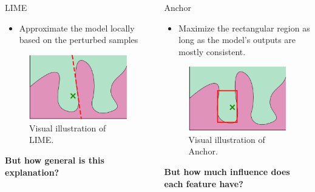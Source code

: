 \documentclass[aspectratio=169]{slide-en}
\begin{document}
\begin{frame}{}
  \vspace{1.5em}
  \begin{columns}[t]
    \begin{column}{0.45\textwidth}
      LIME%
      \begin{itemize}
        \item Approximate the model locally based on the perturbed samples
      \end{itemize}
      \begin{figure}
        \includegraphics[scale=.25]{visual-lime}
        \caption{Visual illustration of LIME\@.}
      \end{figure}
      \textbf{But how general is this explanation?}
    \end{column}
    \begin{column}{0.55\textwidth}
      Anchor
      \begin{itemize}
        \item Maximize the rectangular region as long as
              the model's outputs are mostly consistent.
      \end{itemize}
      \begin{figure}
        \includegraphics[scale=.25]{visual-anchor}
        \caption{Visual illustration of Anchor.}
      \end{figure}
      \textbf{But how much influence does each feature have?}
    \end{column}
  \end{columns}
\end{frame}
\end{document}
